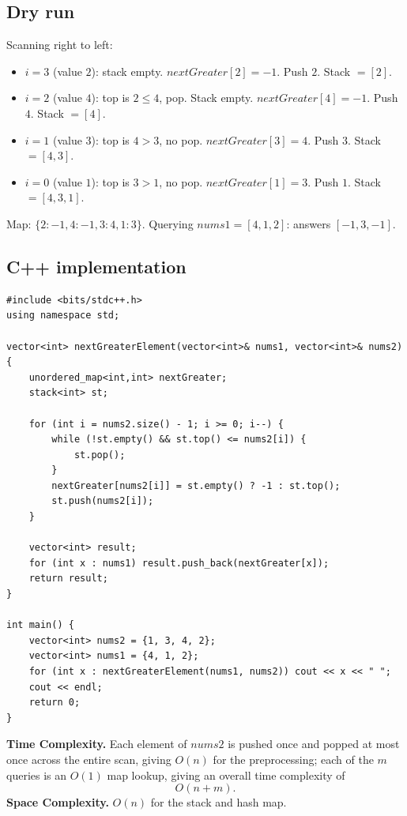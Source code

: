 \subsection*{Dry run}


Scanning right to left:

\begin{itemize}
  \item $i=3$ (value $2$): stack empty. $\textit{nextGreater}[2]=-1$.
        Push $2$. Stack $=[2]$.
  \item $i=2$ (value $4$): top is $2 \le 4$, pop. Stack empty.
        $\textit{nextGreater}[4]=-1$. Push $4$. Stack $=[4]$.
  \item $i=1$ (value $3$): top is $4 > 3$, no pop.
        $\textit{nextGreater}[3]=4$. Push $3$. Stack $=[4,3]$.
  \item $i=0$ (value $1$): top is $3 > 1$, no pop.
        $\textit{nextGreater}[1]=3$. Push $1$. Stack $=[4,3,1]$.
\end{itemize}

Map: $\{2{:}{-1}, 4{:}{-1}, 3{:}4, 1{:}3\}$. Querying $\textit{nums1} =
[4,1,2]$: answers $[-1, 3, -1]$.

\subsection*{C++ implementation}

\begin{lstlisting}
#include <bits/stdc++.h>
using namespace std;

vector<int> nextGreaterElement(vector<int>& nums1, vector<int>& nums2) {
    unordered_map<int,int> nextGreater;
    stack<int> st;

    for (int i = nums2.size() - 1; i >= 0; i--) {
        while (!st.empty() && st.top() <= nums2[i]) {
            st.pop();
        }
        nextGreater[nums2[i]] = st.empty() ? -1 : st.top();
        st.push(nums2[i]);
    }

    vector<int> result;
    for (int x : nums1) result.push_back(nextGreater[x]);
    return result;
}

int main() {
    vector<int> nums2 = {1, 3, 4, 2};
    vector<int> nums1 = {4, 1, 2};
    for (int x : nextGreaterElement(nums1, nums2)) cout << x << " ";
    cout << endl;
    return 0;
}
\end{lstlisting}

\begin{complexitybox}
\textbf{Time Complexity.} Each element of $\textit{nums2}$ is pushed once
and popped at most once across the entire scan, giving $O(n)$ for the
preprocessing; each of the $m$ queries is an $O(1)$ map lookup, giving an
overall time complexity of
\[
  O(n + m).
\]
\textbf{Space Complexity.} $O(n)$ for the stack and hash map.
\end{complexitybox}

